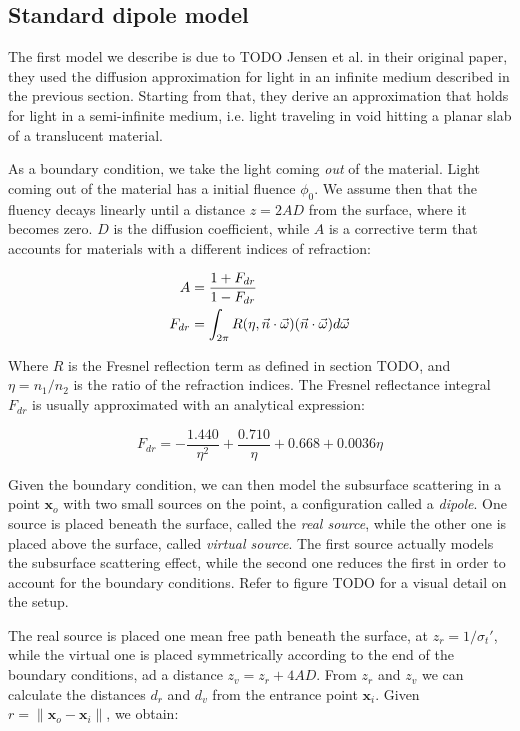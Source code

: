 \subsection{Standard dipole model}

The first model we describe is due to TODO Jensen et al. in their original paper, they used the diffusion approximation for light in an infinite medium described in the previous section. Starting from that, they derive an approximation that holds for light in a semi-infinite medium, i.e. light traveling in void hitting a planar slab of a translucent material.

As a boundary condition, we take the light coming \emph{out} of the material. Light coming out of the material has a initial fluence $\phi_0$. We assume then that the fluency decays linearly until a distance $z = 2 A D$ from the surface, where it becomes zero. $D$ is the diffusion coefficient, while $A$ is a corrective term that accounts for materials with a different indices of refraction:

\begin{equation}
\begin{split}
A &= \frac{1 + F_{dr}}{1 - F_{dr}} \\
F_{dr} &= \int_{2\pi} R(\eta, \vec{n} \cdot \vec{\omega})  (\vec{n} \cdot \vec{\omega}) d \vec{\omega}
\end{split}
\end{equation}

Where $R$ is the Fresnel reflection term as defined in section TODO, and $\eta = n_1 / n_2$ is the ratio of the refraction indices. The Fresnel reflectance integral $F_{dr}$ is usually approximated with an analytical expression:

$$
F_{dr} = -\frac{1.440}{\eta^2} + \frac{0.710}{\eta} + 0.668 + 0.0036 \eta
$$

Given the boundary condition, we can then model the subsurface scattering in a point $\mathbf{x}_o$ with two small sources on the point, a configuration called a \emph{dipole}. One source is placed beneath the surface, called the \emph{real source}, while the other one is placed above the surface, called \emph{virtual source}. The first source actually models the subsurface scattering effect, while the second one reduces the first in order to account for the boundary conditions. Refer to figure TODO for a visual detail on the setup.

The real source is placed one mean free path beneath the surface, at $z_r = 1 / \sigma_t'$, while the virtual one is placed symmetrically according to the end of the boundary conditions, ad a distance $z_v = z_r + 4 A D$. From $z_r$ and $z_v$ we can calculate the distances $d_r$ and $d_v$ from the entrance point $\mathbf{x}_i$. Given $r = \|\mathbf{x}_o -\mathbf{x}_i\|$, we obtain:


